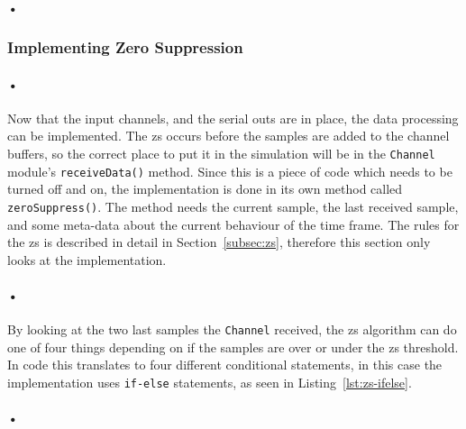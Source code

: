 \documentclass[a4paper, 12pt]{report}
\newcommand{\codeword}[1]{\texttt{#1}}
\begin{document}
\paragraph{•}
\begin{minipage}{\linewidth}

\end{minipage}

\subsubsection{Implementing Zero Suppression}

\paragraph{•} 
Now that the input channels, and the serial outs are in place, the data processing can be implemented.
The \gls{zs} occurs before the samples are added to the channel buffers, so the correct place to put it in the simulation will be in the \codeword{Channel} module's \codeword{receiveData()} method.
Since this is a piece of code which needs to be turned off and on, the implementation is done in its own method called \codeword{zeroSuppress()}.
The method needs the current sample, the last received sample, and some meta-data about the current behaviour of the time frame.
The rules for the \gls{zs} is described in detail in Section~\ref{subsec:zs}, therefore this section only looks at the implementation.

\paragraph{•}
By looking at the two last samples the \codeword{Channel} received, the \gls{zs} algorithm can do one of four things depending on if the samples are over or under the \gls{zs} threshold.
In code this translates to four different conditional statements, in this case the implementation uses \codeword{if-else} statements, as seen in Listing~\ref{lst:zs-ifelse}.

\paragraph{•}
\begin{minipage}{\linewidth}

\end{minipage}
\end{document}
